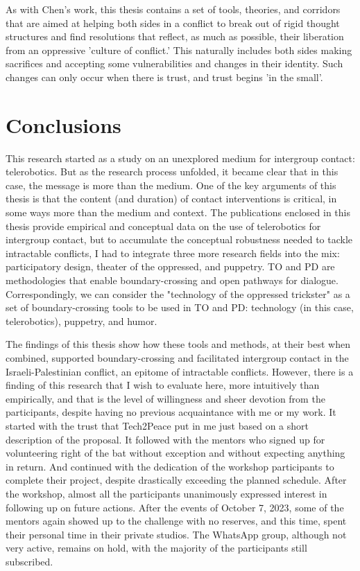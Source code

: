 \documentclass[dissertation,math,vertlayout,pdfa,colorlinks,nologo]{aaltoseries}
\begin{document}
As with Chen's work, this thesis contains a set of tools, theories, and corridors that are aimed at helping both sides in a conflict to break out of rigid thought structures and find resolutions that reflect, as much as possible, their liberation from an oppressive 'culture of conflict.' This naturally includes both sides making sacrifices and accepting some vulnerabilities and changes in their identity. Such changes can only occur when there is trust, and trust begins 'in the small'.

\chapter{Conclusions}
This research started as a study on an unexplored medium for intergroup contact: telerobotics. But as the research process unfolded, it became clear that in this case, the message is more than the medium. One of the key arguments of this thesis is that the content (and duration) of contact interventions is critical, in some ways more than the medium and context. The publications enclosed in this thesis provide empirical and conceptual data on the use of telerobotics for intergroup contact, but to accumulate the conceptual robustness needed to tackle intractable conflicts, I had to integrate three more research fields into the mix: participatory design, theater of the oppressed, and puppetry. TO and PD are methodologies that enable boundary-crossing and open pathways for dialogue. Correspondingly, we can consider the "technology of the oppressed trickster" as a set of boundary-crossing tools to be used in TO and PD: technology (in this case, telerobotics), puppetry, and humor.

The findings of this thesis show how these tools and methods, at their best when combined, supported boundary-crossing and facilitated intergroup contact in the Israeli-Palestinian conflict, an epitome of intractable conflicts. However, there is a finding of this research that I wish to evaluate here, more intuitively than empirically, and that is the level of willingness and sheer devotion from the participants, despite having no previous acquaintance with me or my work. It started with the trust that Tech2Peace put in me just based on a short description of the proposal. It followed with the mentors who signed up for volunteering right of the bat without exception and without expecting anything in return. And continued with the dedication of the workshop participants to complete their project, despite drastically exceeding the planned schedule. After the workshop, almost all the participants unanimously expressed interest in following up on future actions. After the events of October 7, 2023, some of the mentors again showed up to the challenge with no reserves, and this time, spent their personal time in their private studios. The WhatsApp group, although not very active, remains on hold, with the majority of the participants still subscribed.
\end{document}
